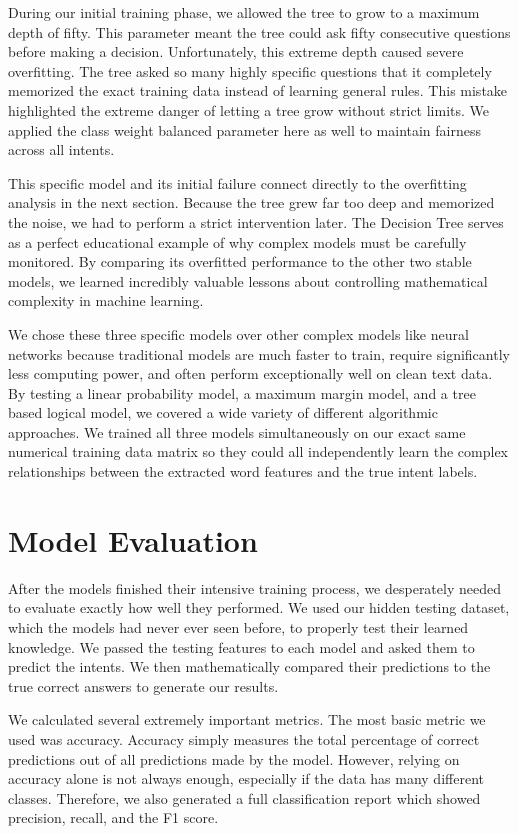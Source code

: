 \documentclass[12pt]{article}
\begin{document}
During our initial training phase, we allowed the tree to grow to a maximum depth of fifty. This parameter meant the tree could ask fifty consecutive questions before making a decision. Unfortunately, this extreme depth caused severe overfitting. The tree asked so many highly specific questions that it completely memorized the exact training data instead of learning general rules. This mistake highlighted the extreme danger of letting a tree grow without strict limits. We applied the class weight balanced parameter here as well to maintain fairness across all intents.

This specific model and its initial failure connect directly to the overfitting analysis in the next section. Because the tree grew far too deep and memorized the noise, we had to perform a strict intervention later. The Decision Tree serves as a perfect educational example of why complex models must be carefully monitored. By comparing its overfitted performance to the other two stable models, we learned incredibly valuable lessons about controlling mathematical complexity in machine learning. 

We chose these three specific models over other complex models like neural networks because traditional models are much faster to train, require significantly less computing power, and often perform exceptionally well on clean text data. By testing a linear probability model, a maximum margin model, and a tree based logical model, we covered a wide variety of different algorithmic approaches. We trained all three models simultaneously on our exact same numerical training data matrix so they could all independently learn the complex relationships between the extracted word features and the true intent labels.

\section{Model Evaluation}
After the models finished their intensive training process, we desperately needed to evaluate exactly how well they performed. We used our hidden testing dataset, which the models had never ever seen before, to properly test their learned knowledge. We passed the testing features to each model and asked them to predict the intents. We then mathematically compared their predictions to the true correct answers to generate our results. 

We calculated several extremely important metrics. The most basic metric we used was accuracy. Accuracy simply measures the total percentage of correct predictions out of all predictions made by the model. However, relying on accuracy alone is not always enough, especially if the data has many different classes. Therefore, we also generated a full classification report which showed precision, recall, and the F1 score. 
\end{document}
